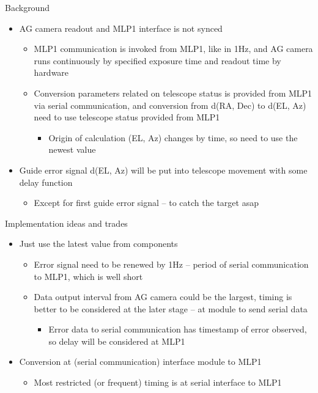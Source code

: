 \documentclass[a4paper,notitlepage]{article}
\begin{document}
Background
\begin{itemize}
  \item AG camera readout and MLP1 interface is not synced
  \begin{itemize}
    \item MLP1 communication is invoked from MLP1, like in 1Hz, and AG camera runs continuously by specified exposure time and readout time by hardware
    \item Conversion parameters related on telescope status is provided from MLP1 via serial communication, and conversion from d(RA, Dec) to d(EL, Az) need to use telescope status provided from MLP1
    \begin{itemize}
      \item Origin of calculation (EL, Az) changes by time, so need to use the newest value
    \end{itemize}
  \end{itemize}
  \item Guide error signal d(EL, Az) will be put into telescope movement with some delay function
  \begin{itemize}
    \item Except for first guide error signal -- to catch the target asap
  \end{itemize}
\end{itemize}

Implementation ideas and trades
\begin{itemize}
  \item Just use the latest value from components
  \begin{itemize}
    \item Error signal need to be renewed by 1Hz -- period of serial communication to MLP1, which is well short
    \item Data output interval from AG camera could be the largest, timing is better to be considered at the later stage -- at module to send serial data
    \begin{itemize}
      \item Error data to serial communication has timestamp of error observed, so delay will be considered at MLP1
    \end{itemize}
  \end{itemize}
  \item Conversion at (serial communication) interface module to MLP1
  \begin{itemize}
    \item Most restricted (or frequent) timing is at serial interface to MLP1
  \end{itemize}
\end{itemize}
\end{document}
